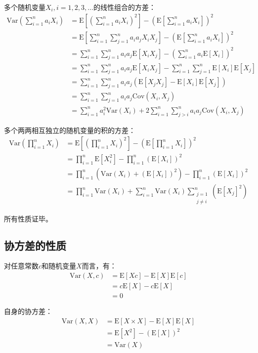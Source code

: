 \documentclass[UTF8]{ctexbook}
\begin{document}
多个随机变量$X_i,i=1,2,3,\dots$的线性组合的方差：
\begin{align*}
	\mathrm{Var}\left(\sum_{i=1}^na_iX_i\right)&=\mathrm E\left[\left(\sum_{i=1}^na_iX_i\right)^2\right]-\left(\mathrm E\left[\sum_{i=1}^na_iX_i\right]\right)^2 \\
	&=\mathrm E\left[\sum_{i=1}^n\sum_{j=1}^na_ia_jX_iX_j\right]-\left(\mathrm E\left[\sum_{i=1}^na_iX_i\right]\right)^2 \\
	&=\sum_{i=1}^n\sum_{j=1}^na_ia_j\mathrm E[X_iX_j]-\left(\sum_{i=1}^na_i\mathrm E[X_i]\right)^2 \\
	&=\sum_{i=1}^n\sum_{j=1}^na_ia_j\mathrm E[X_iX_j]-\sum_{i=1}^n\sum_{j=1}^n\mathrm E[X_i]\mathrm E[X_j] \\
	&=\sum_{i=1}^n\sum_{j=1}^na_ia_j(\mathrm E[X_jX_j]-\mathrm E[X_i]\mathrm E[X_j]) \\
	&=\sum_{i=1}^n\sum_{j=1}^na_ia_j\mathrm{Cov}(X_i,X_j) \\
	&=\sum_{i=1}^na_i^2\mathrm{Var}(X_i)+2\sum_{i=1}^n\sum_{j>i}^na_ia_j\mathrm{Cov}(X_i,X_j)
\end{align*}

多个两两相互独立的随机变量的积的方差：
\begin{align*}
	\mathrm{Var}\left(\prod_{i=1}^nX_i\right)&=\mathrm E\left[\left(\prod_{i=1}^nX_i\right)^2\right]-\left(\mathrm E\left[\prod_{i=1}^nX_i\right]\right)^2 \\
	&=\prod_{i=1}^n\mathrm E[X_i^2]-\prod_{i=1}^n(\mathrm E[X_i])^2 \\
	&=\prod_{i=1}^n(\mathrm{Var}(X_i)+(\mathrm E[X_i])^2)-\prod_{i=1}^n(\mathrm E[X_i])^2 \\
	&=\prod_{i=1}^n\mathrm{Var}(X_i)+\sum_{i=1}^n\mathrm{Var}(X_i)\sum_{\substack{j=1\\ j\neq i}}^n(\mathrm E[X_j]^2)
\end{align*}

所有性质证毕。
\subsection{协方差的性质}
\label{covariance-proof}
对任意常数$c$和随机变量$X$而言，有：
\begin{align*}
	\mathrm{Var}(X,c)&=\mathrm E[Xc]-\mathrm E[X]\mathrm E[c] \\
	&=c\mathrm E[X]-c\mathrm E[X] \\
	&=0
\end{align*}

自身的协方差：
\begin{align*}
	\mathrm{Var}(X,X)&=\mathrm E[X\times X]-\mathrm E[X]\mathrm E[X] \\
	&=\mathrm E[X^2]-(\mathrm E[X])^2 \\
	&=\mathrm{Var}(X)
\end{align*}
\end{document}
